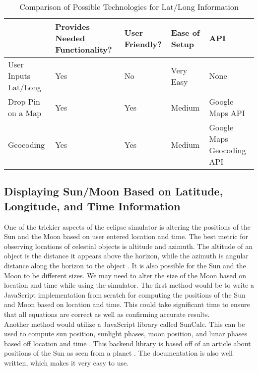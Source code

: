 \documentclass[10pt, onecolumn, draftclsnofoot, letterpaper, compsoc]{IEEEtran}
\begin{document}
\begin{table}[h]
\centering
\caption{Comparison of Possible Technologies for Lat/Long Information}
\begin{tabular}{|p{3.15cm}|p{2cm}|p{2cm}|p{2cm}|p{3.15cm}|}
\cline{5-4}

\hline  & Provides Needed Functionality? & User Friendly? & Ease of Setup
 & API \\ \hline

User Inputs Lat/Long & Yes & No & Very Easy & None \\ \hline

Drop Pin on a Map & Yes & Yes & Medium & Google Maps API \\ \hline

Geocoding & Yes & Yes & Medium & Google Maps Geocoding API \\ \hline

\end{tabular}
\label{table:Jake2}
\end{table}

\subsection{Displaying Sun/Moon Based on Latitude, Longitude, and Time
 Information}

One of the trickier aspects of the eclipse simulator is altering the positions
of the Sun and the Moon based on user entered location and time. The best metric
for observing locations of celestial objects is altitude and azimuth. The
altitude of an object is the distance it appears above the horizon, while the
azimuth is angular distance along the horizon to the object \cite{ALTAZI}.
It is also possible for the Sun and the Moon to be different sizes. We may need
to alter the size of the Moon based on location and time while using the
simulator. The first method would be to write a JavaScript implementation
from scratch for computing the positions of the Sun and Moon based on
location and time. This could take significant time to ensure that all
equations are correct as well as confirming accurate results. \\

Another method would utilize a JavaScript library called SunCalc. This can be
used to compute sun position, sunlight phases, moon position, and lunar phases
based off location and time \cite{SunCalc}. This backend library is based off
of an article about positions of the Sun as seen from a planet \cite{AST}.
The documentation is also well written, which makes it very easy to use. \\
\end{document}
